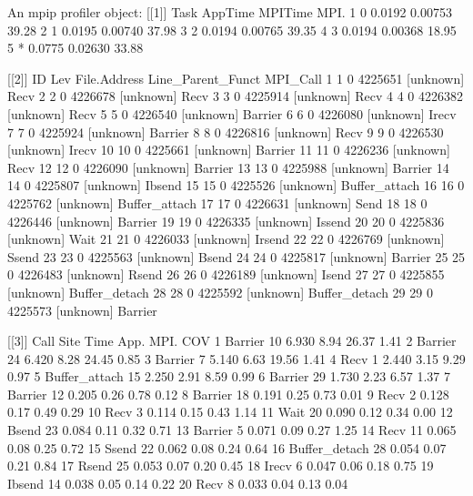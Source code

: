 \begin{Output}
An mpip profiler object:
[[1]]
  Task AppTime MPITime  MPI.
1    0  0.0192 0.00753 39.28
2    1  0.0195 0.00740 37.98
3    2  0.0194 0.00765 39.35
4    3  0.0194 0.00368 18.95
5    *  0.0775 0.02630 33.88

[[2]]
   ID Lev File.Address Line_Parent_Funct      MPI_Call
1   1   0      4225651         [unknown]          Recv
2   2   0      4226678         [unknown]          Recv
3   3   0      4225914         [unknown]          Recv
4   4   0      4226382         [unknown]          Recv
5   5   0      4226540         [unknown]       Barrier
6   6   0      4226080         [unknown]         Irecv
7   7   0      4225924         [unknown]       Barrier
8   8   0      4226816         [unknown]          Recv
9   9   0      4226530         [unknown]         Irecv
10 10   0      4225661         [unknown]       Barrier
11 11   0      4226236         [unknown]          Recv
12 12   0      4226090         [unknown]       Barrier
13 13   0      4225988         [unknown]       Barrier
14 14   0      4225807         [unknown]        Ibsend
15 15   0      4225526         [unknown] Buffer_attach
16 16   0      4225762         [unknown] Buffer_attach
17 17   0      4226631         [unknown]          Send
18 18   0      4226446         [unknown]       Barrier
19 19   0      4226335         [unknown]        Issend
20 20   0      4225836         [unknown]          Wait
21 21   0      4226033         [unknown]        Irsend
22 22   0      4226769         [unknown]         Ssend
23 23   0      4225563         [unknown]         Bsend
24 24   0      4225817         [unknown]       Barrier
25 25   0      4226483         [unknown]         Rsend
26 26   0      4226189         [unknown]         Isend
27 27   0      4225855         [unknown] Buffer_detach
28 28   0      4225592         [unknown] Buffer_detach
29 29   0      4225573         [unknown]       Barrier

[[3]]
            Call Site  Time App.  MPI.  COV
1        Barrier   10 6.930 8.94 26.37 1.41
2        Barrier   24 6.420 8.28 24.45 0.85
3        Barrier    7 5.140 6.63 19.56 1.41
4           Recv    1 2.440 3.15  9.29 0.97
5  Buffer_attach   15 2.250 2.91  8.59 0.99
6        Barrier   29 1.730 2.23  6.57 1.37
7        Barrier   12 0.205 0.26  0.78 0.12
8        Barrier   18 0.191 0.25  0.73 0.01
9           Recv    2 0.128 0.17  0.49 0.29
10          Recv    3 0.114 0.15  0.43 1.14
11          Wait   20 0.090 0.12  0.34 0.00
12         Bsend   23 0.084 0.11  0.32 0.71
13       Barrier    5 0.071 0.09  0.27 1.25
14          Recv   11 0.065 0.08  0.25 0.72
15         Ssend   22 0.062 0.08  0.24 0.64
16 Buffer_detach   28 0.054 0.07  0.21 0.84
17         Rsend   25 0.053 0.07  0.20 0.45
18         Irecv    6 0.047 0.06  0.18 0.75
19        Ibsend   14 0.038 0.05  0.14 0.22
20          Recv    8 0.033 0.04  0.13 0.04


\end{Output}
